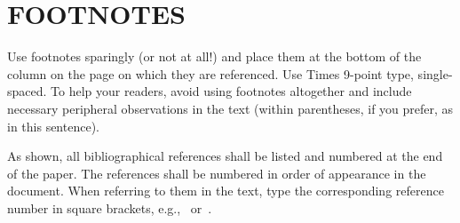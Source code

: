 \documentclass{article}
\begin{document}



\vfill
\pagebreak

\section{FOOTNOTES}
\label{sec:foot}

Use footnotes sparingly (or not at all!) and place them at the bottom of the
column on the page on which they are referenced. Use Times 9-point type,
single-spaced. To help your readers, avoid using footnotes altogether and
include necessary peripheral observations in the text (within parentheses, if
you prefer, as in this sentence).




\noindent As shown, all bibliographical references shall be listed and numbered at the end of the paper. The references shall be numbered in order of appearance in the document.  When referring to them in the text, type the corresponding reference number in square brackets, e.g.,~\cite{C1} or~\cite{C1,C2}.

\end{document}
